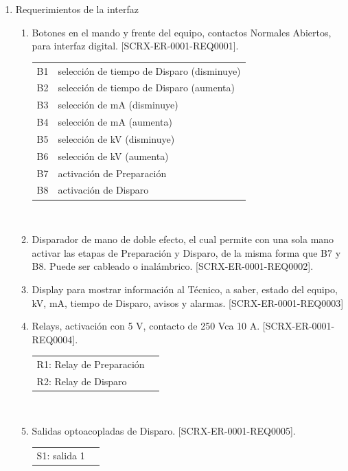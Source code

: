 \documentclass[
11pt, %
]{charter}
\begin{document}
\begin{enumerate}
	\item Requerimientos de la interfaz
	
		\begin{enumerate}
			\item Botones en el mando y frente del equipo, contactos Normales Abiertos, para interfaz digital. [SCRX-ER-0001-REQ0001]. \\
				\begin{tabular}{l l} \\
					B1 & selección de tiempo de Disparo (disminuye) \\
					B2 & selección de tiempo de Disparo (aumenta) \\
					B3 & selección de mA (disminuye) \\
					B4 & selección de mA (aumenta) \\
					B5 & selección de kV (disminuye) \\
					B6 & selección de kV (aumenta) \\
					B7 & activación de Preparación \\
					B8 & activación de Disparo \\
				\end{tabular} \\
			\item Disparador de mano de doble efecto, el cual permite con una sola mano activar las etapas de Preparación y Disparo, de la misma forma que B7 y B8. Puede ser cableado o inalámbrico. [SCRX-ER-0001-REQ0002].
			\item Display para mostrar información al Técnico, a saber, estado del equipo, kV, mA, tiempo de Disparo, avisos y alarmas. [SCRX-ER-0001-REQ0003]
			\item Relays, activación con 5 V, contacto de 250 Vca 10 A. [SCRX-ER-0001-REQ0004]. \\
				\begin{tabular}{l l} \\
					R1: Relay de Preparación \\
					R2: Relay de Disparo \\
				\end{tabular} \\
			\item Salidas optoacopladas de Disparo. [SCRX-ER-0001-REQ0005]. \\
				\begin{tabular}{l l} \\
					S1: salida 1 \\

\end{tabular}
\end{enumerate}
\end{enumerate}
\end{document}
